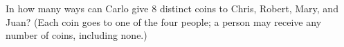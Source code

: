 In how many ways can Carlo give $8$ distinct coins to Chris, Robert, Mary, and Juan? (Each coin goes to one of the four people; a person may receive any number of coins, including none.)
